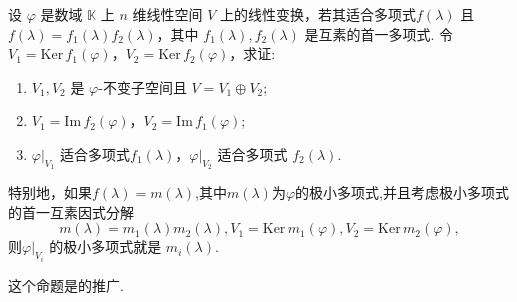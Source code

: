 \documentclass[../../main.tex]{subfiles}%
\begin{document}
\begin{corollary}\label{corollary:矩阵适合多项式诱导的结论}
设 $\varphi$ 是数域 $\mathbb{K}$ 上 $n$ 维线性空间 $V$ 上的线性变换，若其适合多项式$f(\lambda)$ 且 $f(\lambda)=f_1(\lambda)f_2(\lambda)$，其中 $f_1(\lambda),f_2(\lambda)$ 是互素的首一多项式. 令 $V_1 = \mathrm{Ker}\,f_1(\varphi)$，$V_2 = \mathrm{Ker}\,f_2(\varphi)$，求证:
\begin{enumerate}[(1)]
\item  $V_1,V_2$ 是 $\varphi$-不变子空间且 $V = V_1\oplus V_2$;

\item $V_1 = \mathrm{Im}\,f_2(\varphi)$，$V_2 = \mathrm{Im}\,f_1(\varphi)$;

\item $\varphi|_{V_1}$ 适合多项式$f_1(\lambda)$，$\varphi|_{V_2}$ 适合多项式 $f_2(\lambda)$.
\end{enumerate}
特别地，如果$f(\lambda)=m(\lambda)$,其中$m(\lambda)$为$\varphi$的极小多项式,并且考虑极小多项式的首一互素因式分解
\[m(\lambda)=m_1(\lambda)m_2(\lambda), V_1 = \mathrm{Ker}\,m_1(\varphi), V_2 = \mathrm{Ker}\,m_2(\varphi),\]
则$\varphi|_{V_i}$ 的极小多项式就是 $m_i(\lambda)$.
\end{corollary}
\begin{remark}
这个命题是的推广.
\end{remark}
\end{document}
